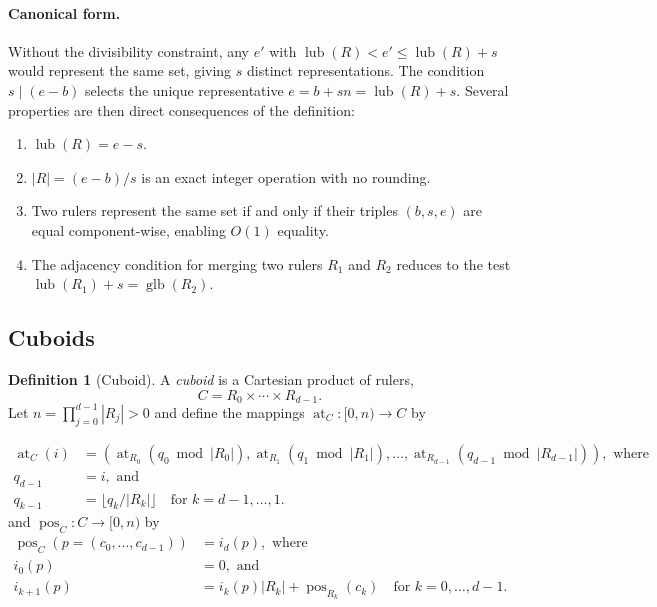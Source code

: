 \documentclass[manuscript,screen,review]{acmart}
\theoremstyle{definition}
\newtheorem{definition}{Definition}
\theoremstyle{plain}
\begin{document}
\paragraph{Canonical form.}
Without the divisibility constraint, any $e'$ with $\operatorname{lub}(R) < e' \leq
\operatorname{lub}(R)+s$ would represent the same set, giving $s$
distinct representations. The condition $s \mid (e-b)$ selects the unique
representative $e = b + sn = \operatorname{lub}(R)+s$.
Several properties are then direct consequences of the definition:
\begin{enumerate}[label=(\roman*), leftmargin=*]
  \item $\operatorname{lub}(R) = e-s$.
  \item $|R| = (e-b)/s$ is an exact integer operation with no rounding.
  \item Two rulers represent the same set if and only if their triples $(b,s,e)$
    are equal component-wise, enabling $O(1)$ equality.
  \item The adjacency condition for merging two rulers $R_1$ and $R_2$
    reduces to the test $\operatorname{lub}(R_1)+s = \operatorname{glb}(R_2)$.
\end{enumerate}

\subsection{Cuboids}

\begin{definition}[Cuboid]
A \emph{cuboid} is a Cartesian product of rulers,
\[
  C = R_0 \times \cdots \times R_{d-1}.
  \]
  Let $n=\prod_{j=0}^{d-1} |R_j| > 0$ and define the
  mappings $\operatorname{at}_C:[0,n)\to C$ by

\begin{align*}
  \operatorname{at}_C(i) &= (\operatorname{at}_{R_0}(q_0 \bmod
  |R_0|),\operatorname{at}_{R_1}(q_1 \bmod
  |R_1|),\dots,\operatorname{at}_{R_{d-1}}(q_{d-1} \bmod |R_{d-1}|)),
  \text{ where}
  \\ q_{d-1}&=i, \text{ and}
  \\ q_{k-1}&=\lfloor q_k / |R_k| \rfloor \quad\text{for } k=d{-}1,\ldots,1.
\end{align*}
  and $\operatorname{pos}_C:C\to [0,n)$ by
\begin{align*}
  \operatorname{pos}_C(p=(c_0,\ldots,c_{d-1})) &= i_d(p), \text{ where}
\\  i_0(p) &= 0, \text{ and}
\\  i_{k+1}(p) &= i_k(p) |R_k| + \operatorname{pos}_{R_k}(c_k) \quad\text{for } k=0,\ldots,d{-}1.
\end{align*}

\end{definition}
\end{document}
